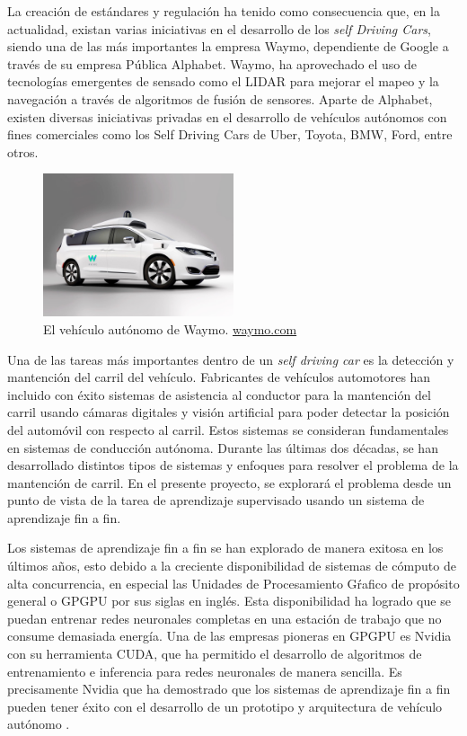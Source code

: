 \documentclass[12pt,letterpaper]{article}
\begin{document}
La creación de estándares y regulación ha tenido como consecuencia que, en la actualidad, existan varias iniciativas 
en el desarrollo de los \textit{self Driving Cars}, siendo una de las más 
importantes la empresa Waymo, dependiente de Google a través de su empresa Pública Alphabet. Waymo, ha aprovechado 
el uso de tecnologías emergentes de sensado como el LIDAR para mejorar el mapeo y la navegación a través de algoritmos 
de fusión de sensores. Aparte de Alphabet, existen diversas iniciativas privadas en el desarrollo de vehículos autónomos 
con fines comerciales como los Self Driving Cars de Uber, Toyota, BMW, Ford, entre otros.


\begin{figure}[!h] 
\centering
\includegraphics[width=0.5\textwidth]{waymo}
\caption{El vehículo autónomo de Waymo. 
        \href{https://waymo.com/}{waymo.com}}
\label{fig:waymo}
\end{figure}

Una de las tareas más importantes dentro de un \textit{self driving car} es la detección y mantención del carril del 
vehículo. Fabricantes de vehículos automotores han incluido con éxito sistemas de asistencia al conductor para la 
mantención del carril usando cámaras digitales y visión artificial para poder detectar la posición del automóvil con 
respecto al carril. Estos sistemas se consideran fundamentales en sistemas de conducción autónoma. Durante las últimas 
dos décadas, se han desarrollado distintos tipos de sistemas y enfoques para resolver el problema de la mantención de 
carril. En el presente proyecto, se explorará el problema desde un punto de vista de la tarea de aprendizaje supervisado
usando un sistema de aprendizaje fin a fin.

Los sistemas de aprendizaje fin a fin se han explorado de manera exitosa en los últimos años, esto debido a la creciente
disponibilidad de sistemas de cómputo de alta concurrencia, en especial las Unidades de Procesamiento Gŕafico de propósito
general o GPGPU por sus siglas en inglés. Esta disponibilidad ha logrado que se puedan entrenar redes neuronales completas 
en una estación de trabajo que no consume demasiada energía. Una de las empresas pioneras en GPGPU es Nvidia con su herramienta 
CUDA, que ha permitido el desarrollo de algoritmos de entrenamiento e inferencia para redes neuronales de manera sencilla. Es 
precisamente Nvidia que ha demostrado que los sistemas de aprendizaje fin a fin pueden tener éxito con el desarrollo de un 
prototipo y arquitectura de vehículo autónomo \cite{bojarski2016end}.
\end{document}

